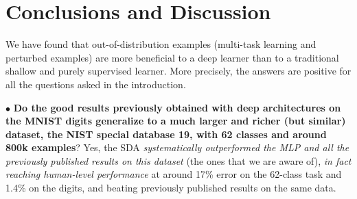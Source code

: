 \documentclass{article} %
\begin{document}

\vspace*{-2mm}
\section{Conclusions and Discussion}
\vspace*{-2mm}

We have found that out-of-distribution examples (multi-task learning
and perturbed examples) are more beneficial
to a deep learner than to a traditional shallow and purely
supervised learner. More precisely, 
the answers are positive for all the questions asked in the introduction.

$\bullet$ %
{\bf Do the good results previously obtained with deep architectures on the
MNIST digits generalize to a much larger and richer (but similar)
dataset, the NIST special database 19, with 62 classes and around 800k examples}?
Yes, the SDA {\em systematically outperformed the MLP and all the previously
published results on this dataset} (the ones that we are aware of), {\em in fact reaching human-level
performance} at around 17\% error on the 62-class task and 1.4\% on the digits,
and beating previously published results on the same data.
\end{document}
